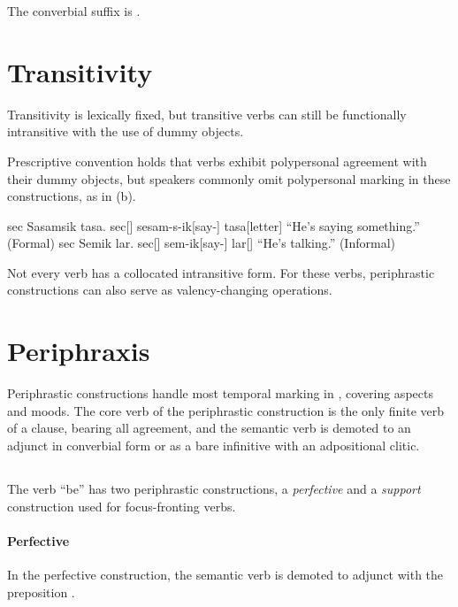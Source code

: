 The converbial suffix is .

\section{Transitivity}
Transitivity is lexically fixed, but transitive verbs can still be functionally intransitive with the use of dummy objects.

Prescriptive convention holds that verbs exhibit polypersonal agreement with their dummy objects, but speakers commonly omit polypersonal marking in these constructions, as in (\nextx b).

\begin{gloss}
	\a \begingl
		\glpreamble sec Sasamsik tasa. \endpreamble
			sec[]
			sesam-s-ik[say-]
			tasa[letter]
		\glft “He's saying something.”
		\trailingcitation (Formal)
	\endgl
	\a \begingl
		\glpreamble sec Semik lar. \endpreamble
			sec[]
			sem-ik[say-]
			lar[]
		\glft “He's talking.”
		\trailingcitation (Informal)
	\endgl {}
\end{gloss}

Not every verb has a collocated intransitive form. For these verbs, periphrastic constructions can also serve as valency-changing operations.

\section{Periphraxis}
Periphrastic constructions handle most temporal marking in \langname{}, covering aspects and moods. The core verb of the periphrastic construction is the only finite verb of a clause, bearing all agreement, and the semantic verb is demoted to an adjunct in converbial form or as a bare infinitive with an adpositional clitic.

\subsection{}
The verb  “be” has two periphrastic constructions, a \emph{perfective} and a \emph{support} construction used for focus-fronting verbs.

\paragraph{Perfective}
In the perfective construction, the semantic verb is demoted to adjunct with the preposition .

